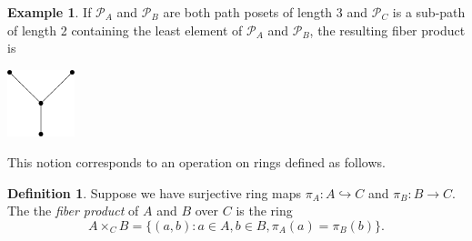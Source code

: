 \documentclass[11pt]{amsart}
\renewcommand{\P}{{\mathcal P}}
\theoremstyle{plain} %
\theoremstyle{definition}
\newtheorem{defn}[thm]{Definition}
\newtheorem{ex}[thm]{Example}
\theoremstyle{remark}
\numberwithin{equation}{section}  %
\begin{document}
\begin{ex}
If $\P_A$ and $\P_B$ are both path posets of length $3$ and $\P_C$ is a sub-path of length 2 containing the least element of  $\P_A$ and $\P_B$, 
the resulting fiber product is
\begin{center}
	\includegraphics[height=1.95cm]{Pictures/fiber_product_hasse.pdf}
\end{center}
\end{ex}

%
%

This notion corresponds to an operation on rings defined as follows.

\begin{tcolorbox}
\begin{defn}\label{def: fiber product rings}
Suppose we have surjective ring maps $\pi_A:A\hookrightarrow C$ and $\pi_B:B\to C$. The the {\em fiber product} of $A$ and $B$ over $C$ is the ring
\[
A\times_C B= \{(a,b): a\in A, b\in B, \pi_A(a)=\pi_B(b)\}.
\]
\end{defn}
\end{tcolorbox}
\end{document}
